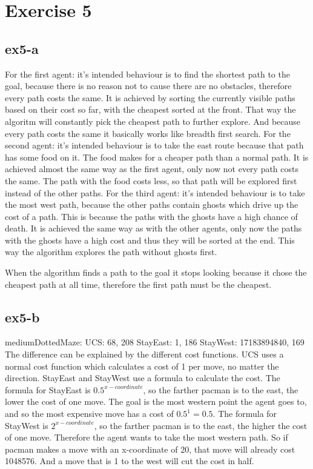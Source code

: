 \section{Exercise 5}
\subsection{ex5-a}
For the first agent: it's intended behaviour is to find the shortest path to the goal, because there is no
reason not to cause there are no obstacles, therefore every path costs the same. 
It is achieved by sorting the currently visible paths based on their cost so far, with the cheapest sorted 
at the front. That way the algoritm will constantly pick the cheapest path to further explore. 
And because every path costs the same it basically works like breadth first search.
For the second agent: it's intended behaviour is to take the east route because that path has some food on it.
The food makes for a cheaper path than a normal path. It is achieved almost the same way as the first agent, 
only now not every path costs the same. The path with the food costs less, so that path will be explored 
first instead of the other paths.
For the third agent: it's intended behaviour is to take the most west path, because the other paths contain 
ghosts which drive up the cost of a path. This is because the paths with the ghosts have a high chance of death.
It is achieved the same way as with the other agents, only now the paths with the ghosts have a high cost and 
thus they will be sorted at the end. This way the algorithm explores the path without ghosts first.

When the algorithm finds a path to the goal it stops looking because it chose the cheapest path at all time,
therefore the first path must be the cheapest.


\subsection{ex5-b}
mediumDottedMaze: 
UCS: 68, 208
StayEast: 1, 186
StayWest: 17183894840, 169
The difference can be explained by the different cost functions. UCS uses a normal cost function which
calculates a cost of 1 per move, no matter the direction. StayEast and StayWest use a formula to calculate the cost. 
The formula for StayEast is $0.5^{x-coordinate}$, so the farther pacman is to the east, 
the lower the cost of one move. The goal is the most western point the agent goes to, 
and so the most expensive move has a cost of $0.5^1 = 0.5$.
The formula for StayWest is $2^{x-coordinate}$, so the farther pacman is to the east, the higher the cost of one move.
Therefore the agent wants to take the most western path. So if pacman makes a move with an x-coordinate of 20,
that move will already cost 1048576. And a move that is 1 to the west will cut the cost in half.